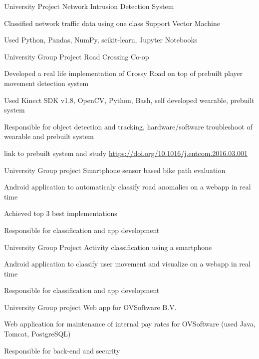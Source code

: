 
\begin{cventries}

  \cventry
  {University Project}
  {Network Intrusion Detection System}
  {}
  {}
  {
    \begin{cvitems}
      \item {Classified network traffic data using one class Support Vector Machine}
      \item {Used Python, Pandas, NumPy, scikit-learn, Jupyter Notebooks}
    \end{cvitems}
  }

  \cventry
  {University Group Project}
  {Road Crossing Co-op}
  {}
  {}
  {
    \begin{cvitems}
      \item {Developed a real life implementation of Crossy Road on top of prebuilt player movement detection system}
      \item {Used Kinect SDK v1.8, OpenCV, Python, Bash, self developed wearable, prebuilt system}
      \item {Responsible for object detection and tracking, hardware/software troubleshoot of wearable and prebuilt system}
      \item {link to prebuilt system and study \url{https://doi.org/10.1016/j.entcom.2016.03.001}}
    \end{cvitems}
  }

  \cventry
  {University Group project}
  {Smartphone sensor based bike path evaluation}
  {}
  {}
  {
    \begin{cvitems}
      \item {Android application to automaticaly classify road anomalies on a webapp in real time}
      \item {Achieved top 3 best implementations}
      \item {Responsible for classification and app development}
    \end{cvitems}
  }

  \cventry
  {University Group Project}
  {Activity classification using a smartphone}
  {}
  {}
  {
    \begin{cvitems}
      \item {Android application to classify user movement and visualize on a webapp in real time}
      \item {Responsible for classification and app development}
    \end{cvitems}
  }

  \cventry
  {University Group project}
  {Web app for OVSoftware B.V.}
  {}
  {}
  {
    \begin{cvitems}
      \item {Web application for maintenance of internal pay rates for OVSoftware (used Java, Tomcat,
      PostgreSQL)}
      \item {Responsible for back-end and security}
    \end{cvitems}
  }


\end{cventries}
